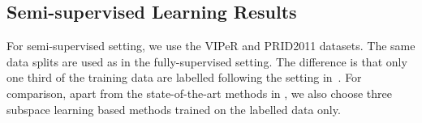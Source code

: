 \documentclass[10pt,twocolumn,letterpaper]{article}
\begin{document}
	
	\begin{table}[H]
		\centering
		\caption{Fully supervised results on Market1501}
		\label{market}
	\end{table}
	


\subsection{Semi-supervised Learning Results}

For semi-supervised setting, we use the VIPeR and PRID2011 datasets. The same data splits are used  as in the fully-supervised setting. The difference is that only one third of  the training data are labelled following the setting  in~\cite{liu2014semi, kodirovdictionary}. For comparison, apart from the state-of-the-art methods in \cite{liu2014semi, kodirovdictionary}, we also choose three subspace learning based methods trained on the labelled data only. 
\end{document}
